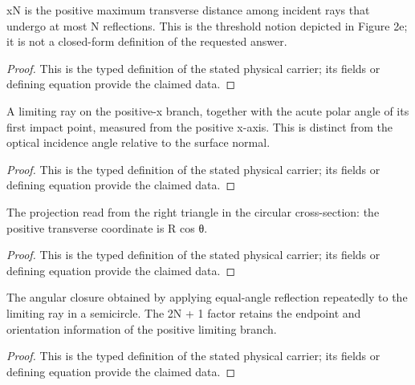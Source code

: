 \begin{definition}
  \label{def:physics:IPhO_2026_2_A_1:aux008}
  xN is the positive maximum transverse distance among incident rays that undergo at most N reflections. This is the threshold notion depicted in Figure 2e; it is not a closed-form definition of the requested answer.
\end{definition}
\begin{proof}
  This is the typed definition of the stated physical carrier; its fields or defining equation provide the claimed data.
\end{proof}

\begin{definition}
  \label{def:physics:IPhO_2026_2_A_1:aux009}
  A limiting ray on the positive-x branch, together with the acute polar angle of its first impact point, measured from the positive x-axis. This is distinct from the optical incidence angle relative to the surface normal.
\end{definition}
\begin{proof}
  This is the typed definition of the stated physical carrier; its fields or defining equation provide the claimed data.
\end{proof}

\begin{definition}
  \label{def:physics:IPhO_2026_2_A_1:aux010}
  The projection read from the right triangle in the circular cross-section: the positive transverse coordinate is R cos θ.
\end{definition}
\begin{proof}
  This is the typed definition of the stated physical carrier; its fields or defining equation provide the claimed data.
\end{proof}

\begin{definition}
  \label{def:physics:IPhO_2026_2_A_1:aux011}
  The angular closure obtained by applying equal-angle reflection repeatedly to the limiting ray in a semicircle. The 2N + 1 factor retains the endpoint and orientation information of the positive limiting branch.
\end{definition}
\begin{proof}
  This is the typed definition of the stated physical carrier; its fields or defining equation provide the claimed data.
\end{proof}

